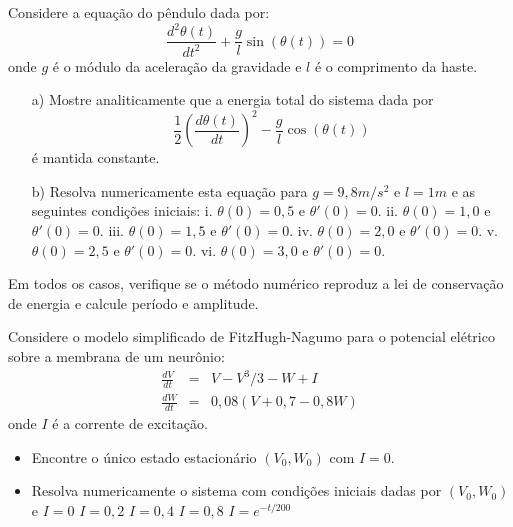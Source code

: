 \begin{exer} Considere a equação do pêndulo dada por:
$$\frac{d^2\theta(t)}{dt^2}+\frac{g}{l}\sin(\theta(t))=0$$
onde $g$ é o módulo da aceleração da gravidade e $l$ é o comprimento da haste.
\begin{itemize}
\item[a)] Mostre analiticamente que a energia total do sistema dada por
$$\frac{1}{2}\left(\frac{d\theta(t)}{dt}\right)^2-\frac{g}{l}\cos(\theta(t))$$
é mantida constante.
\item[b)] Resolva numericamente esta equação para $g=9,8m/s^2$ e $l=1m$ e as seguintes condições iniciais:
\subitem i. $\theta(0)=0,5$ e $\theta'(0)=0$.
\subitem ii. $\theta(0)=1,0$ e $\theta'(0)=0$.
\subitem iii. $\theta(0)=1,5$ e $\theta'(0)=0$.
\subitem iv. $\theta(0)=2,0$ e $\theta'(0)=0$.
\subitem v. $\theta(0)=2,5$ e $\theta'(0)=0$.
\subitem vi. $\theta(0)=3,0$ e $\theta'(0)=0$.
\end{itemize}
Em todos os casos, verifique se o método numérico reproduz a lei de conservação de energia e calcule período e amplitude.
\end{exer}

\begin{exer} Considere o modelo simplificado de FitzHugh-Nagumo para o potencial elétrico sobre a membrana de um neurônio:
\begin{eqnarray*}
\frac{d V}{dt}& = &  V-V^3/3 - W +  I  \\
\frac{d W}{dt} & = & 0,08(V+0,7 - 0,8W)
\end{eqnarray*}
onde $I$ é a corrente de excitação.
\begin{itemize}
\item Encontre o único estado estacionário $\left(V_0,W_0\right)$ com $I=0$.
\item Resolva numericamente o sistema com condições iniciais dadas por $\left(V_0,W_0\right)$ e
\subitem $I=0$
\subitem $I=0,2$
\subitem $I=0,4$
\subitem $I=0,8$
\subitem $I=e^{-t/200}$
\end{itemize}
\end{exer}



%



